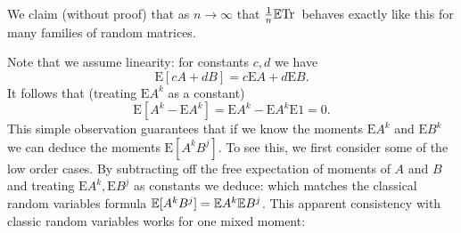 We claim (without proof) that as $n \ensuremath{\rightarrow} \ensuremath{\infty}$ that ${1 \over n} {\mathbb E} {\rm Tr}\,$ behaves exactly like this for many families of random matrices. 

Note that we assume linearity: for constants $c,d$ we have
\[
\ensuremath{\bm{\mathrm{E}}}[c A + d B] = c \ensuremath{\bm{\mathrm{E}}}  A + d \ensuremath{\bm{\mathrm{E}}} B.
\]
It follows that (treating $\ensuremath{\bm{\mathrm{E}}}A^k$ as a constant)
\[
\ensuremath{\bm{\mathrm{E}}}[A^k - \ensuremath{\bm{\mathrm{E}}}A^k] =  \ensuremath{\bm{\mathrm{E}}} A^k - \ensuremath{\bm{\mathrm{E}}}A^k \ensuremath{\bm{\mathrm{E}}}1  = 0.
\]
This simple observation guarantees that if we know the moments $\ensuremath{\bm{\mathrm{E}}} A^k$ and $\ensuremath{\bm{\mathrm{E}}} B^k$ we can deduce the moments $\ensuremath{\bm{\mathrm{E}}}[A^k B^j]$. To see this, we first consider some of the low order cases. By subtracting off the free expectation of moments of $A$ and $B$ and treating $\ensuremath{\bm{\mathrm{E}}} A^k , \ensuremath{\bm{\mathrm{E}}}B^j$ as constants we deduce:
which matches the classical random variables formula ${\mathbb E}[A^k B^j] = {\mathbb E} A^k {\mathbb E} B^j$. This apparent consistency with classic random variables works for one mixed moment:
